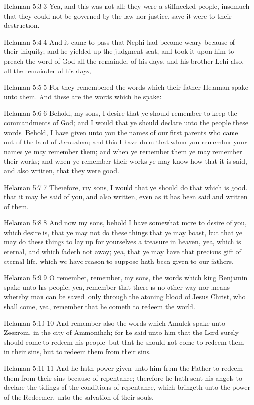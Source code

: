 Helaman 5:3
 3 Yea, and this was not all; they were a stiffnecked people,
insomuch that they could not be governed by the law nor justice,
save it were to their destruction.

Helaman 5:4
 4 And it came to pass that Nephi had become weary because of
their iniquity; and he yielded up the judgment-seat, and took it
upon him to preach the word of God all the remainder of his days,
and his brother Lehi also, all the remainder of his days;

Helaman 5:5
 5 For they remembered the words which their father Helaman spake
unto them. And these are the words which he spake:

Helaman 5:6
 6 Behold, my sons, I desire that ye should remember to keep the
commandments of God; and I would that ye should declare unto the
people these words. Behold, I have given unto you the names of
our first parents who came out of the land of Jerusalem; and this
I have done that when you remember your names ye may remember
them; and when ye remember them ye may remember their works; and
when ye remember their works ye may know how that it is said, and
also written, that they were good.

Helaman 5:7
 7 Therefore, my sons, I would that ye should do that which is
good, that it may be said of you, and also written, even as it
has been said and written of them.

Helaman 5:8
 8 And now my sons, behold I have somewhat more to desire of you,
which desire is, that ye may not do these things that ye may
boast, but that ye may do these things to lay up for yourselves a
treasure in heaven, yea, which is eternal, and which fadeth not
away; yea, that ye may have that precious gift of eternal life,
which we have reason to suppose hath been given to our fathers.

Helaman 5:9
 9 O remember, remember, my sons, the words which king Benjamin
spake unto his people; yea, remember that there is no other way
nor means whereby man can be saved, only through the atoning
blood of Jesus Christ, who shall come, yea, remember that he
cometh to redeem the world.

Helaman 5:10
 10 And remember also the words which Amulek spake unto Zeezrom,
in the city of Ammonihah; for he said unto him that the Lord
surely should come to redeem his people, but that he should not
come to redeem them in their sins, but to redeem them from their
sins.

Helaman 5:11
 11 And he hath power given unto him from the Father to redeem
them from their sins because of repentance; therefore he hath
sent his angels to declare the tidings of the conditions of
repentance, which bringeth unto the power of the Redeemer, unto
the salvation of their souls.

